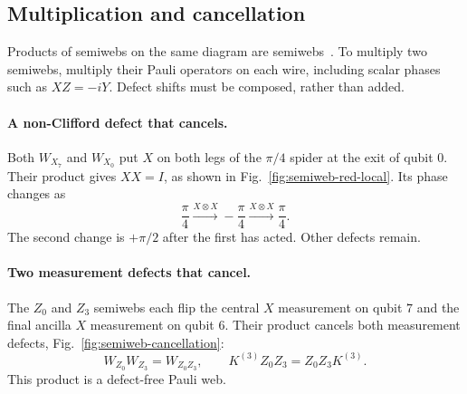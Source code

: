 \begin{semiwebaddition}
\subsection{Multiplication and cancellation}
Products of semiwebs on the same diagram are semiwebs~\cite{zxflow}.
To multiply two semiwebs, multiply their Pauli operators on each wire, including scalar phases such as
$XZ=-iY$. Defect shifts must be composed, rather than added.

\paragraph{A non-Clifford defect that cancels.}
Both $W_{X_7}$ and $W_{X_0}$ put $X$ on both legs of the
$\pi/4$ spider at the exit of qubit $0$. Their product gives $XX=I$,
as shown in Fig.~\ref{fig:semiweb-red-local}. Its phase changes as
\begin{equation}
 \frac{\pi}{4}\xrightarrow{X\otimes X}-\frac{\pi}{4}
 \xrightarrow{X\otimes X}\frac{\pi}{4}.
 \label{eq:semiweb-phase-cancellation}
\end{equation}
The second change is $+\pi/2$ after the first has acted. Other defects remain.



\paragraph{Two measurement defects that cancel.}
The $Z_0$ and $Z_3$ semiwebs each flip the central $X$ measurement on
qubit $7$ and the final ancilla $X$ measurement on qubit $6$.
Their product cancels both measurement defects,
Fig.~\ref{fig:semiweb-cancellation}:
\begin{equation}
 W_{Z_0}W_{Z_3}=W_{Z_0Z_3},\qquad K^{(3)}Z_0Z_3=Z_0Z_3K^{(3)}.
 \label{eq:semiweb-Z-product}
\end{equation}
This product is a defect-free Pauli web.



\FloatBarrier
\end{semiwebaddition}
